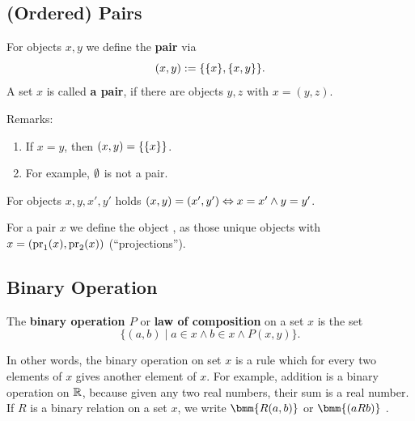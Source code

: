 \documentclass[12pt]{book}
\begin{document}
\subsection{(Ordered) Pairs}
\label{sec:ordpairs}

\begin{defi}\label{def:pairs}
      For objects $x, y$ we define the \textbf{pair}  via
      \begin{displaymath}
            (x,y) := \{ \{ x \},\{ x,y \} \}.
      \end{displaymath}
      A set $x$ is called \textbf{a pair}, if there are objects $y,z$ with $x = (y,z)$.
\end{defi}
Remarks:
\begin{enumerate}
      \item If $x=y$, then $(x,y) = \{ \{ x \} \}$.
      \item For example, $\emptyset$ is not a pair.
\end{enumerate}
\begin{lem}\label{lem:pairs}
      For objects $x, y, x', y'$ holds $(x,y) = (x',y') \Leftrightarrow x = x' \wedge y = y'$.
\end{lem}
\begin{defi}\label{def:projpairs}
      For a pair $x$ we define the object ,  as those unique objects with $x = (\operatorname{pr}_1(x), \operatorname{pr}_2(x))$ (``projections'').
\end{defi}

\subsection{Binary Operation}
\label{sec:Binary Operation}

\begin{defi}\label{def:bop}
      The \textbf{binary operation $P$} or \textbf{law of composition} on a set $x$ is the set 
	  $$ \{ (a,b) \mid a \in x \wedge b \in x \wedge P(x,y) \}.$$
\end{defi}
In other words, the binary operation on set $x$ is a rule which for every two elements of $x$ gives another element of $x$.
For example, addition is a binary operation on $\mathbb{R}$, because given any two real numbers, their sum is a real number.
If $R$ is a binary relation on a set $x$, we write $ \bmm{R(a,b)}$ or $\bmm{(aRb)}$ \cite{h1}.
\end{document}
